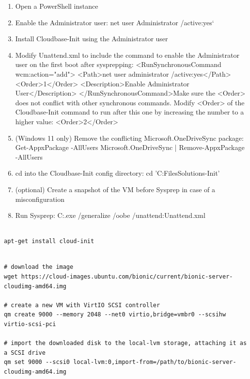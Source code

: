 \begin{enumerate}[leftmargin=2cm]

	\item Open a PowerShell instance

	\item Enable the Administrator user: net user Administrator /active:yes`

	\item Install Cloudbase-Init using the Administrator user

	\item Modify Unattend.xml to include the command to enable the Administrator user on the first boot after sysprepping: <RunSynchronousCommand wcm:action="add"> <Path>net user administrator /active:yes</Path> <Order>1</Order> <Description>Enable Administrator User</Description> </RunSynchronousCommand>Make sure the <Order> does not conflict with other synchronous commands. Modify <Order> of the Cloudbase-Init command to run after this one by increasing the number to a higher value: <Order>2</Order>

	\item (Windows 11 only) Remove the conflicting Microsoft.OneDriveSync package: Get-AppxPackage -AllUsers Microsoft.OneDriveSync | Remove-AppxPackage -AllUsers

	\item cd into the Cloudbase-Init config directory: cd 'C:\Program Files\Cloudbase Solutions\Cloudbase-Init\conf'

	\item (optional) Create a snapshot of the VM before Sysprep in case of a misconfiguration

	\item Run Sysprep: C:\Windows{}\Sysprep\sysprep.exe /generalize /oobe /unattend:Unattend.xml

\end{enumerate}

\begin{lstlisting}

apt-get install cloud-init

\end{lstlisting}

\begin{lstlisting}

# download the image
wget https://cloud-images.ubuntu.com/bionic/current/bionic-server-cloudimg-amd64.img

# create a new VM with VirtIO SCSI controller
qm create 9000 --memory 2048 --net0 virtio,bridge=vmbr0 --scsihw virtio-scsi-pci

# import the downloaded disk to the local-lvm storage, attaching it as a SCSI drive
qm set 9000 --scsi0 local-lvm:0,import-from=/path/to/bionic-server-cloudimg-amd64.img

\end{lstlisting}

